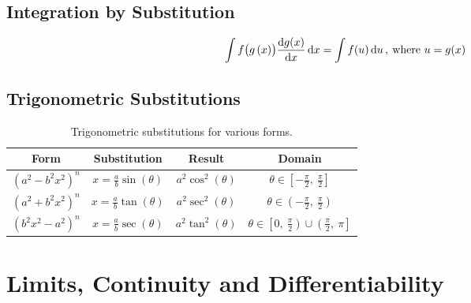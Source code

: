 \documentclass{article}
\begin{document}
\subsection{Integration by Substitution}
\begin{theorem}
    \begin{equation*}
        \int f\bigl(g\left( x \right)\bigr)\dv{g(x)}{x} \dd{x} = \int f(u) \dd{u}, \: \text{where } u = g(x)
    \end{equation*}
\end{theorem}
\subsection{Trigonometric Substitutions}
\begin{table}[H]
    \renewcommand*{\arraystretch}{1.5}
    \centering
    \begin{tabular}{c c c c}
        \toprule
        \textbf{Form}      & \textbf{Substitution}                           & \textbf{Result}           & \textbf{Domain}                                                             \\
        \midrule
        \(\left(a^2-b^2x^2\right)^n\) & \(\displaystyle x=\frac{a}{b}\sin{\left( \theta \right)}\) & \(a^2\cos^2{\left( \theta \right)}\) & \(\theta\in \left[ -\frac{\pi}{2},\: \frac{\pi}{2} \right]\)                           \\[8pt]
        \(\left(a^2+b^2x^2\right)^n\) & \(\displaystyle x=\frac{a}{b}\tan{\left( \theta \right)}\) & \(a^2\sec^2{\left( \theta \right)}\) & \(\theta\in \left( -\frac{\pi}{2},\: \frac{\pi}{2} \right)\)                           \\[8pt]
        \(\left(b^2x^2-a^2\right)^n\) & \(\displaystyle x=\frac{a}{b}\sec{\left( \theta \right)}\) & \(a^2\tan^2{\left( \theta \right)}\) & \(\theta\in \left[ 0,\: \frac{\pi}{2} \right) \cup \left(\frac{\pi}{2},\: \pi\right]\) \\ %
        \bottomrule
    \end{tabular}
    \caption{Trigonometric substitutions for various forms.}
\end{table}
\newpage
\section{Limits, Continuity and Differentiability}
\end{document}
